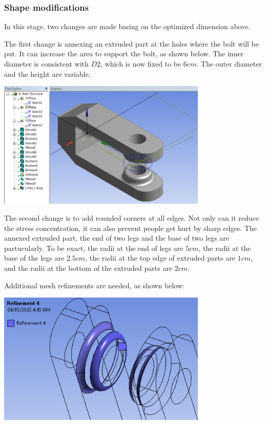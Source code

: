 \documentclass[a4paper,14pt]{extarticle}
\begin{document}
\subsubsection{Shape modifications}
In this stage, two changes are made basing on the optimized dimension above.

The first change is annexing an extruded part at the holes where the bolt will be put. It can increase the area to support the bolt, as shown below. The inner diameter is consistent with $D2$, which is now fixed to be $6cm$. The outer diameter and the height are variable.

\begin{center}\includegraphics[width=0.75\textwidth]{NX/GEOMETRY.PNG}\end{center}

The second change is to add rounded corners at all edges. Not only can it reduce the stress concentration, it can also prevent people get hurt by sharp edges. The annexed extruded part, the end of two legs and the base of two legs are partucularly. To be exact, the radii at the end of legs are $5cm$, the radii at the base of the legs are $2.5cm$, the radii at the top edge of extruded parts are $1cm$, and the radii at the bottom of the extruded parts are $2cm$.

Additional mesh refinements are needed, as shown below:

\begin{center}\includegraphics[width=0.75\textwidth]{NX/REF2.PNG}\end{center}
\end{document}
